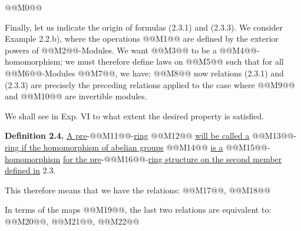 @@M0@@

Finally, let us indicate the origin of formulas (2.3.1) and (2.3.3). We consider Example 2.2.b), where the operations @@M1@@ are defined by the exterior powers of @@M2@@-Modules. We want @@M3@@ to be a @@M4@@-homomorphism; we must therefore define laws on @@M5@@ such that for all @@M6@@-Modules @@M7@@, we have:
@@M8@@
now relations (2.3.1) and (2.3.3) are precisely the preceding relations applied to the case where @@M9@@ and @@M10@@ are invertible modules.

We shall see in Exp. VI to what extent the desired property is satisfied.

\textbf{Definition 2.4.} \uline{A pre}-@@M11@@-\uline{ring} @@M12@@ \uline{will be called a} @@M13@@-\uline{ring if the homomorphism of abelian groups} @@M14@@ \uline{is a} @@M15@@-\uline{homomorphism} \uline{for the pre}-@@M16@@-\uline{ring structure on the second member defined in} 2.3.

This therefore means that we have the relations: @@M17@@,
@@M18@@

In terms of the maps @@M19@@, the last two relations are equivalent to: @@M20@@, @@M21@@,
@@M22@@


